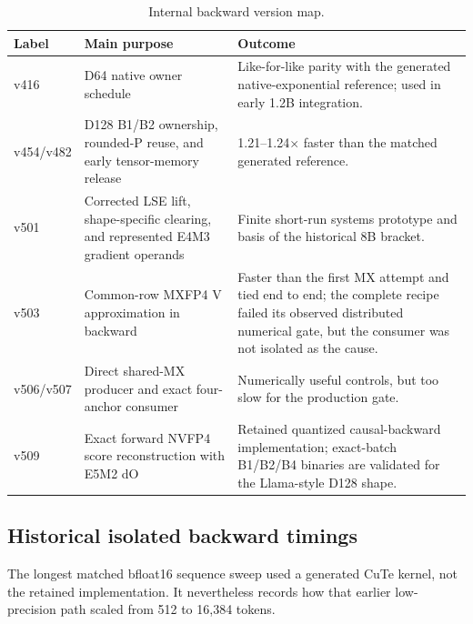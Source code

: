 \begin{table}[htbp]
\centering
\caption{Internal backward version map.}
\label{tab:causal-version-map}
\small
\begin{tabularx}{\textwidth}{l p{}X}
\toprule
Label & Main purpose & Outcome \\
\midrule
v416 & D64 native owner schedule & Like-for-like parity with the generated
native-exponential reference; used in early 1.2B integration. \\
v454/v482 & D128 B1/B2 ownership, rounded-P reuse, and early tensor-memory
release & 1.21--1.24$\times$ faster than the matched generated reference. \\
v501 & Corrected LSE lift, shape-specific clearing, and represented E4M3
gradient operands & Finite short-run systems prototype and basis of the
historical 8B bracket. \\
v503 & Common-row MXFP4 V approximation in backward & Faster than the first
MX attempt and tied end to end; the complete recipe failed its observed
distributed numerical gate, but the consumer was not isolated as the cause. \\
v506/v507 & Direct shared-MX producer and exact four-anchor consumer &
Numerically useful controls, but too slow for the production gate. \\
v509 & Exact forward NVFP4 score reconstruction with E5M2 dO & Retained
quantized causal-backward implementation; exact-batch B1/B2/B4 binaries are
validated for the Llama-style D128 shape. \\
\bottomrule
\end{tabularx}
\end{table}
\FloatBarrier

\subsection{Historical isolated backward timings}

The longest matched bfloat16 sequence sweep used a generated CuTe kernel, not
the retained implementation.  It nevertheless records how that earlier
low-precision path scaled from 512 to 16,384 tokens.

